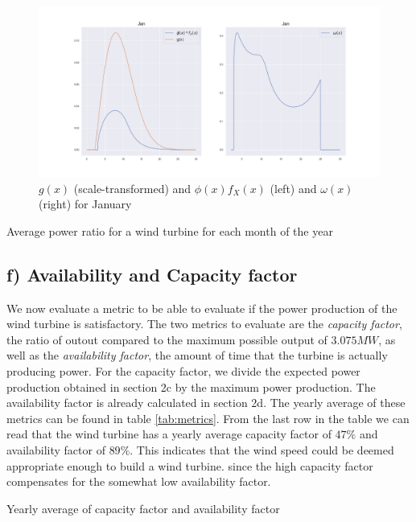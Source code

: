 \documentclass[a4paper]{article}
\begin{document}
\begin{figure}[H]
    \centering
    \includegraphics[width = 1.0\textwidth]{images/janPowerRatio}
    \caption{$g(x)$ (scale-transformed) and $\phi(x)f_X(x)$ (left) and $\omega(x)$ (right) for January}
    \label{fig:janPowerRatio}
\end{figure}

\begin{table}[H]
    \centering
    \caption{Average power ratio for a wind turbine for each month of the year}
    \label{tab:powercoeff}
    
\end{table}

\subsection*{f) Availability and Capacity factor}
We now evaluate a metric to be able to evaluate if the power production of the wind turbine is satisfactory. The two metrics to evaluate are the \textit{capacity factor}, the ratio of outout compared to the maximum possible output of $3.075MW$, as well as the \textit{availability factor}, the amount of time that the turbine is actually producing power. For the capacity factor, we divide the expected power production obtained in section 2c by the maximum power production. The availability factor is already calculated in section 2d. The yearly average of these metrics can be found in table \ref{tab:metrics}. From the last row in the table we can read that the wind turbine has a yearly average capacity factor of $47\%$ and availability factor of $89\%$. This indicates that the wind speed could be deemed appropriate enough to build a wind turbine. since the high capacity factor compensates for the somewhat low availability factor.

\begin{table}[H]
    \centering
    \caption{Yearly average of capacity factor and availability factor}
    \label{tab:metrics}
    
\end{table}
\end{document}
